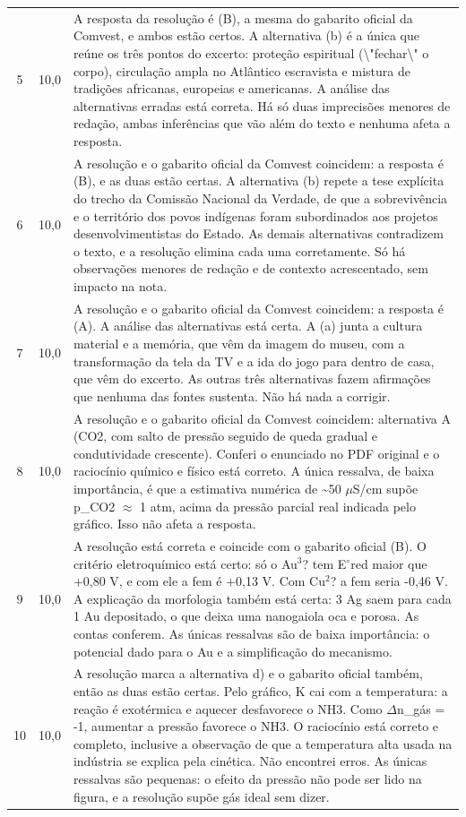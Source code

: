 \documentclass{article}%
\begin{document}
\begin{longtable}{@{}c c p{}@{}}
5 & 10,0 & A resposta da resolução é (B), a mesma do gabarito oficial da Comvest, e ambos estão certos. A alternativa (b) é a única que reúne os três pontos do excerto: proteção espiritual (\textbackslash{}"fechar\textbackslash{}" o corpo), circulação ampla no Atlântico escravista e mistura de tradições africanas, europeias e americanas. A análise das alternativas erradas está correta. Há só duas imprecisões menores de redação, ambas inferências que vão além do texto e nenhuma afeta a resposta. \\
6 & 10,0 & A resolução e o gabarito oficial da Comvest coincidem: a resposta é (B), e as duas estão certas. A alternativa (b) repete a tese explícita do trecho da Comissão Nacional da Verdade, de que a sobrevivência e o território dos povos indígenas foram subordinados aos projetos desenvolvimentistas do Estado. As demais alternativas contradizem o texto, e a resolução elimina cada uma corretamente. Só há observações menores de redação e de contexto acrescentado, sem impacto na nota. \\
7 & 10,0 & A resolução e o gabarito oficial da Comvest coincidem: a resposta é (A). A análise das alternativas está certa. A (a) junta a cultura material e a memória, que vêm da imagem do museu, com a transformação da tela da TV e a ida do jogo para dentro de casa, que vêm do excerto. As outras três alternativas fazem afirmações que nenhuma das fontes sustenta. Não há nada a corrigir. \\
8 & 10,0 & A resolução e o gabarito oficial da Comvest coincidem: alternativa A (CO2, com salto de pressão seguido de queda gradual e condutividade crescente). Conferi o enunciado no PDF original e o raciocínio químico e físico está correto. A única ressalva, de baixa importância, é que a estimativa numérica de \textasciitilde{}50 $\mu$S/cm supõe p\_CO2 $\approx$ 1 atm, acima da pressão parcial real indicada pelo gráfico. Isso não afeta a resposta. \\
9 & 10,0 & A resolução está correta e coincide com o gabarito oficial (B). O critério eletroquímico está certo: só o Au$^3$? tem E$^\circ$red maior que +0,80 V, e com ele a fem é +0,13 V. Com Cu$^2$? a fem seria -0,46 V. A explicação da morfologia também está certa: 3 Ag saem para cada 1 Au depositado, o que deixa uma nanogaiola oca e porosa. As contas conferem. As únicas ressalvas são de baixa importância: o potencial dado para o Au e a simplificação do mecanismo. \\
10 & 10,0 & A resolução marca a alternativa d) e o gabarito oficial também, então as duas estão certas. Pelo gráfico, K cai com a temperatura: a reação é exotérmica e aquecer desfavorece o NH3. Como $\Delta$n\_gás = -1, aumentar a pressão favorece o NH3. O raciocínio está correto e completo, inclusive a observação de que a temperatura alta usada na indústria se explica pela cinética. Não encontrei erros. As únicas ressalvas são pequenas: o efeito da pressão não pode ser lido na figura, e a resolução supõe gás ideal sem dizer. \\

\end{longtable}
\end{document}
